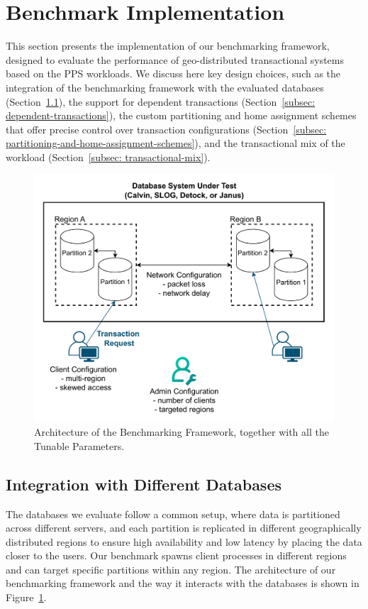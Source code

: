 \documentclass{article}
\begin{document}
\section{Benchmark Implementation}
\label{sec: benchmark-implementation}
This section presents the implementation of our benchmarking framework, designed to evaluate the performance of geo-distributed transactional systems based on the PPS workloads. We discuss here key design choices, such as the integration of the benchmarking framework with the evaluated databases (Section~\ref{subsec: integration-with-different-databases}), the support for dependent transactions (Section~\ref{subsec: dependent-transactions}), the custom partitioning and home assignment schemes that offer precise control over transaction configurations (Section~\ref{subsec: partitioning-and-home-assignment-schemes}), and the transactional mix of the workload (Section~\ref{subsec: transactional-mix}).

\begin{figure}[ht]
    \centering
    \includegraphics[width=1\linewidth]{figures/Overall Architecture.pdf}
    \caption{Architecture of the Benchmarking Framework, together with all the Tunable Parameters.}
    \label{fig: overall-architecture}
\end{figure}

\subsection{Integration with Different Databases}
\label{subsec: integration-with-different-databases}
The databases we evaluate follow a common setup, where data is partitioned across different servers, and each partition is replicated in different geographically distributed regions to ensure high availability and low latency by placing the data closer to the users. Our benchmark spawns client processes in different regions and can target specific partitions within any region. The architecture of our benchmarking framework and the way it interacts with the databases is shown in Figure~\ref{fig: overall-architecture}.
\end{document}
